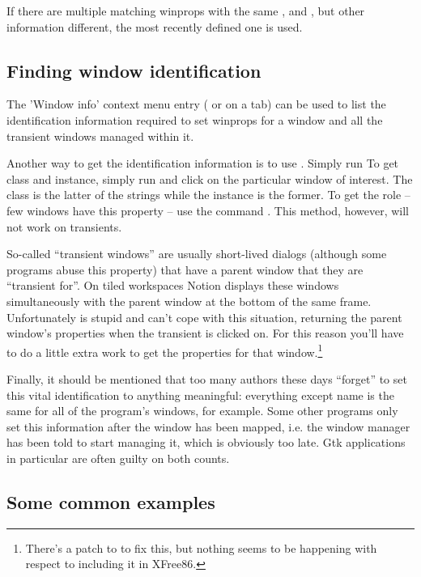 If there are multiple matching winprops with the same
,  and , but other information
different, the most recently defined one is used.


\subsection{Finding window identification}

The 'Window info' context menu entry ( or  on a tab)
can be used to list the identification information required to set winprops
for a window and all the transient windows managed within it. 

Another way to get the identification information is to use .
Simply run To get class and instance, simply run 
and click on the particular window of interest. The class is the latter of
the strings while the instance is the former.  To get the role -- few
windows have this property -- use the command . 
This method, however, will not work on transients. 

So-called ``transient windows'' are usually short-lived dialogs (although
some programs abuse this property) that have a parent window that they are
``transient for''. On tiled workspaces Notion displays these windows 
simultaneously with the parent window at the bottom of the same frame.
Unfortunately  is stupid and can't cope with this situation,
returning the parent window's properties when the transient is clicked on.
For this reason you'll have to do a little extra work to get the properties
for that window.\footnote{There's a patch to  to
fix this, but nothing seems to be happening with respect to including it in 
XFree86.}

Finally, it should be mentioned that too many authors these days
``forget'' to set this vital identification to anything meaningful:
everything except name is the same for all of the program's 
windows, for example. Some other programs only set this information
after the window has been mapped, i.e. the window manager has been
told to start managing it, which is obviously too late. 
Gtk applications in particular are often guilty on both counts.


\subsection{Some common examples}

